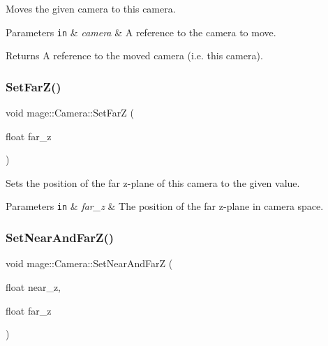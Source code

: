 Moves the given camera to this camera.


\begin{DoxyParams}[1]{Parameters}
\mbox{\tt in}  & {\em camera} & A reference to the camera to move. \\
\hline
\end{DoxyParams}
\begin{DoxyReturn}{Returns}
A reference to the moved camera (i.\+e. this camera). 
\end{DoxyReturn}
\hypertarget{classmage_1_1_camera_ae5b70f109df3649d31e9e364080e9d72}{}\label{classmage_1_1_camera_ae5b70f109df3649d31e9e364080e9d72} 
\subsubsection{\texorpdfstring{Set\+Far\+Z()}{SetFarZ()}}
{\footnotesize\ttfamily void mage\+::\+Camera\+::\+Set\+FarZ (\begin{DoxyParamCaption}\item[{float}]{far\+\_\+z }\end{DoxyParamCaption})\hspace{0.3cm}{\ttfamily [noexcept]}}

Sets the position of the far z-\/plane of this camera to the given value.


\begin{DoxyParams}[1]{Parameters}
\mbox{\tt in}  & {\em far\+\_\+z} & The position of the far z-\/plane in camera space. \\
\hline
\end{DoxyParams}
\hypertarget{classmage_1_1_camera_a1854150387f3bfff7cc526b296859a7e}{}\label{classmage_1_1_camera_a1854150387f3bfff7cc526b296859a7e} 
\subsubsection{\texorpdfstring{Set\+Near\+And\+Far\+Z()}{SetNearAndFarZ()}}
{\footnotesize\ttfamily void mage\+::\+Camera\+::\+Set\+Near\+And\+FarZ (\begin{DoxyParamCaption}\item[{float}]{near\+\_\+z,  }\item[{float}]{far\+\_\+z }\end{DoxyParamCaption})\hspace{0.3cm}{\ttfamily [noexcept]}}

